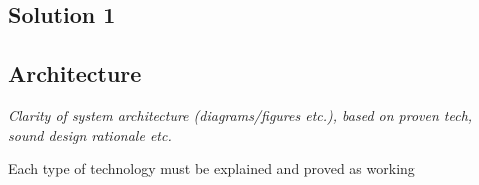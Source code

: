 
\subsection{Solution 1}

\subsection{Architecture}
\textit{Clarity of system
architecture
(diagrams/figures etc.),
based on proven tech,
sound design rationale
etc.}

Each type of technology must be explained and proved as working
\